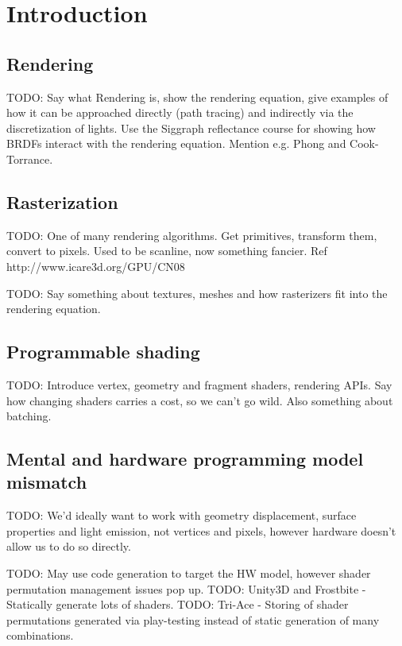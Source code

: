 
\chapter{ Introduction }
\label{Chapter1}

\section{Rendering}

TODO: Say what Rendering is, show the rendering equation, give examples of how it can be approached directly (path tracing) and indirectly via the discretization of lights. Use the Siggraph reflectance course for showing how BRDFs interact with the rendering equation. Mention e.g. Phong and Cook-Torrance.

\section{Rasterization}

TODO: One of many rendering algorithms. Get primitives, transform them, convert to pixels. Used to be scanline, now something fancier. Ref http://www.icare3d.org/GPU/CN08

TODO: Say something about textures, meshes and how rasterizers fit into the rendering equation.

\section{Programmable shading}

TODO: Introduce vertex, geometry and fragment shaders, rendering APIs. Say how changing shaders carries a cost, so we can't go wild. Also something about batching.

\section{Mental and hardware programming model mismatch}

TODO: We'd ideally want to work with geometry displacement, surface properties and light emission, not vertices and pixels, however hardware doesn't allow us to do so directly.

TODO: May use code generation to target the HW model, however shader permutation management issues pop up.
	TODO: Unity3D and Frostbite - Statically generate lots of shaders.
	TODO: Tri-Ace - Storing of shader permutations generated via play-testing instead of static generation of many combinations.

